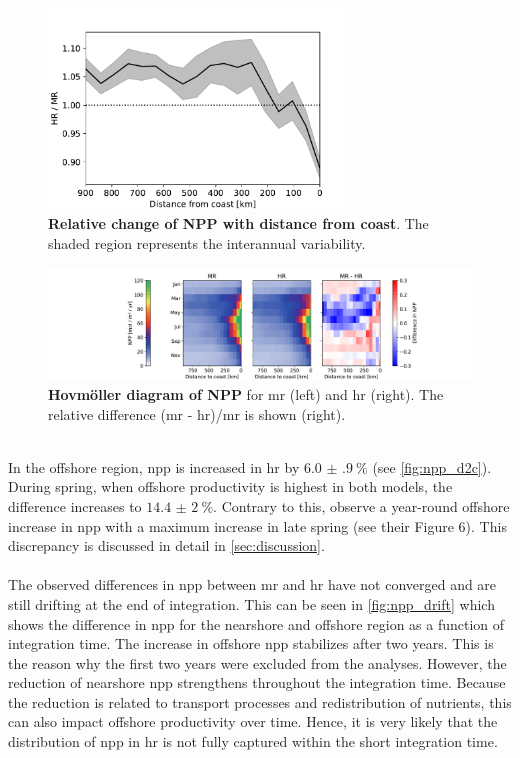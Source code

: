 \begin{figure}
    \centering
    \includegraphics[width=8cm, trim=0 0 0 0]{../figures/result_npp_reduction.pdf}
    \caption[Relative change of NPP with distance from coast]{\textbf{Relative change of NPP with distance from coast}. The shaded region represents the interannual variability.}
    \label{fig:npp_d2c}
\end{figure}
\begin{figure}
    \centering
    \hspace*{0.3cm}\includegraphics[width=17cm, trim=7cm 0 0 0]{../figures/result_npp_diff.pdf}
    \caption[Hovmöller diagram of NPP]{\textbf{Hovmöller diagram of NPP} for \ac{mr} (left) and \ac{hr} (right). The relative difference (\ac{mr}  - \ac{hr})/\ac{mr} is shown (right).}\label{fig:npp_diff}
\end{figure}
\\
In the offshore region, \ac{npp} is increased in \ac{hr} by $\SI[separate-uncertainty]{6.0(9)}{\percent}$ (see \autoref{fig:npp_d2c}). During spring, when offshore productivity is highest in both models, the difference increases to $\SI[separate-uncertainty]{14.4(20)}{\percent}$. Contrary to this, \textcite{kessouri-2020-seasonal-prod} observe a year-round offshore increase in \ac{npp} with a maximum increase in late spring (see their Figure 6). This discrepancy is discussed in detail in \autoref{sec:discussion}.\\
\\
The observed differences in \ac{npp} between \ac{mr} and \ac{hr} have not converged and are still drifting at the end of integration. This can be seen in \autoref{fig:npp_drift} which shows the difference in \ac{npp} for the nearshore and offshore region as a function of integration time. The increase in offshore \ac{npp} stabilizes after two years. This is the reason why the first two years were excluded from the analyses. However, the reduction of nearshore \ac{npp} strengthens throughout the integration time. Because the reduction is related to transport processes and redistribution of nutrients, this can also impact offshore productivity over time. Hence, it is very likely that the distribution of \ac{npp} in \ac{hr} is not fully captured within the short integration time.